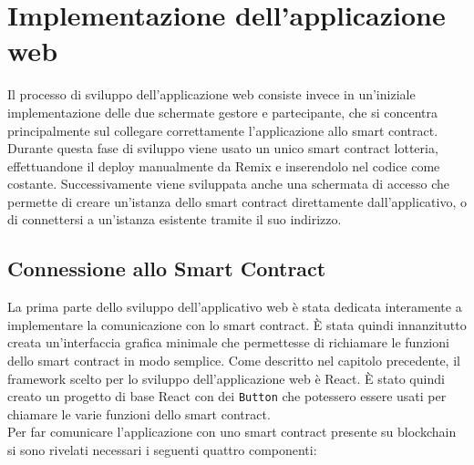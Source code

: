 \documentclass[12pt,a4paper,openright,twoside]{report}
\begin{document}
\section{Implementazione dell'applicazione web}
Il processo di sviluppo dell'applicazione web consiste invece in un'iniziale implementazione delle due schermate gestore e partecipante, che si concentra principalmente sul collegare correttamente l'applicazione allo smart contract. Durante questa fase di sviluppo viene usato un unico smart contract lotteria, effettuandone il deploy manualmente da Remix e inserendolo nel codice come costante. Successivamente viene sviluppata anche una schermata di accesso che permette di creare un'istanza dello smart contract direttamente dall'applicativo, o di connettersi a un'istanza esistente tramite il suo indirizzo.

\subsection{Connessione allo Smart Contract}
La prima parte dello sviluppo dell'applicativo web è stata dedicata interamente a implementare la comunicazione con lo smart contract. È stata quindi innanzitutto creata un'interfaccia grafica minimale che permettesse di richiamare le funzioni dello smart contract in modo semplice. Come descritto nel capitolo precedente, il framework scelto per lo sviluppo dell'applicazione web è React. È stato quindi creato un progetto di base React con dei \texttt{Button} che potessero essere usati per chiamare le varie funzioni dello smart contract.\\
Per far comunicare l'applicazione con uno smart contract presente su blockchain si sono rivelati necessari i seguenti quattro componenti:
\end{document}

